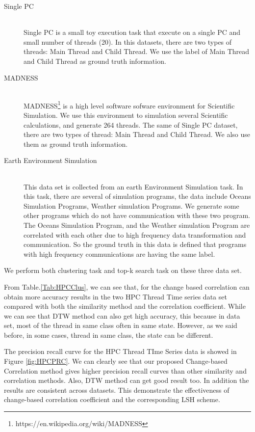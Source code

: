 \begin{description}
  \item[Single PC] \hfill \\
  Single PC is a small toy execution task that execute on a single PC and small number of threads (20). In this datasets, there are two types of threads: Main Thread and Child Thread. We use the label of Main Thread and Child Thread as ground truth information.
  \item[MADNESS] \hfill \\ MADNESS\footnote{https://en.wikipedia.org/wiki/MADNESS} is a high level software sofware environment for Scientific Simulation. We use this environment to simulation several Scientific calculations, and generate 264 threads.
  The same of Single PC dataset, there are two types of thread: Main Thread and Child Thread. We also use them as ground truth information.
  \item[Earth Environment Simulation] \hfill \\ 
  This data set is collected from an earth Environment Simulation task. In this task, there are several of simulation programs, the data include Oceans Simulation Programs, Weather simulation Programs. We generate some other programs which do not have communication with these two program. The Oceans Simulation Program, and the Weather simulation Program are correlated with each other due to high frequency data transformation and communication. So the ground truth in this data is defined that programs with high frequency communications are having the same label.
\end{description}

We perform both clustering task and top-k search task on these three data set.

From Table.\ref{Tab:HPCClus}, we can see that, for the change based correlation can obtain more accuracy results in the two HPC Thread Time series data set compared with both the similarity method and the correlation coefficient. While we can see that DTW method can also get high accuracy, this because in data set, most of the thread in same class often in same state. However, as we said before, in some cases, thread in same class, the state can be different.

The precision recall curve for the HPC Thread TIme Series data is showed in Figure \ref{fig:HPCPRC}. We can clearly see that our proposed Change-based Correlation method gives higher precision recall curves than other similarity and correlation methods. Also, DTW method can get good result too. In addition the results are consistent across datasets. This demonstrate the effectiveness of change-based correlation coefficient and the corresponding LSH scheme.

